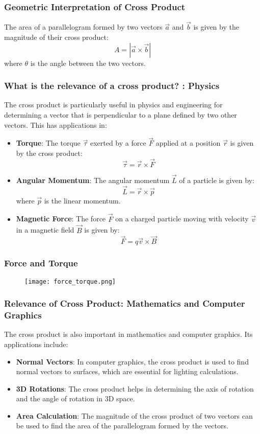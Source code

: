 \begin{frame}
    \frametitle{Geometric Interpretation of Cross Product}
    The area of a parallelogram formed by two vectors \(\vec{a}\) and \(\vec{b}\) is given by the magnitude of their cross product:
    \[
    A = |\vec{a} \times \vec{b}|
    \]
    where \(\theta\) is the angle between the two vectors.

\end{frame}



\begin{frame}
    \frametitle{What is the relevance of a cross product? : Physics}
    The cross product is particularly useful in physics and engineering for determining a vector that is perpendicular to a plane defined by two other vectors. This has applications in:
    \begin{itemize}
        \item \textbf{Torque}: The torque \(\vec{\tau}\) exerted by a force \(\vec{F}\) applied at a position \(\vec{r}\) is given by the cross product:
        \[
        \vec{\tau} = \vec{r} \times \vec{F}
        \]
        \item \textbf{Angular Momentum}: The angular momentum \(\vec{L}\) of a particle is given by:
        \[
        \vec{L} = \vec{r} \times \vec{p}
        \]
        where \(\vec{p}\) is the linear momentum.
        \item \textbf{Magnetic Force}: The force \(\vec{F}\) on a charged particle moving with velocity \(\vec{v}\) in a magnetic field \(\vec{B}\) is given by:
        \[
        \vec{F} = q \vec{v} \times \vec{B}
        \]
    \end{itemize}
\end{frame}

\begin{frame}
    \frametitle{Force and Torque} 
    \begin{figure}
        \texttt{[image: force\_torque.png]}
    \end{figure}
\end{frame}

\begin{frame}
    \frametitle{Relevance of Cross Product: Mathematics and Computer Graphics}
    The cross product is also important in mathematics and computer graphics. Its applications include:
    \begin{itemize}
        \item \textbf{Normal Vectors}: In computer graphics, the cross product is used to find normal vectors to surfaces, which are essential for lighting calculations.
        \item \textbf{3D Rotations}: The cross product helps in determining the axis of rotation and the angle of rotation in 3D space.
        \item \textbf{Area Calculation}: The magnitude of the cross product of two vectors can be used to find the area of the parallelogram formed by the vectors.
    \end{itemize}
\end{frame}

